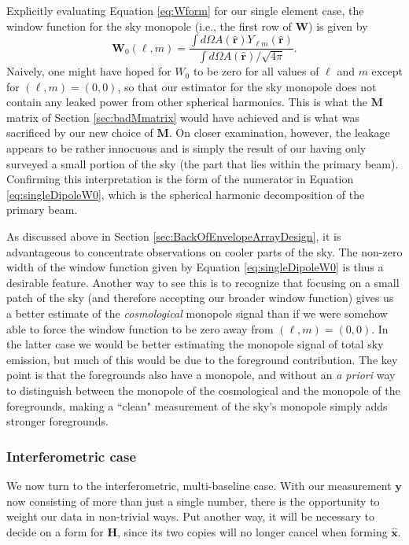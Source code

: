 \documentclass[twocolumn,apj,numberedappendix]{emulateapj}
\newcommand{\xhat}{\hat{\mathbf{x}}}
\newcommand{\Hmat}{\mathbf{H}}
\newcommand{\M}{\mathbf{M}}
\newcommand{\W}{\mathbf{W}}
\begin{document}
Explicitly evaluating Equation \eqref{eq:Wform} for our single element case, the window function for the sky monopole (i.e., the first row of $\W$) is given by
\begin{equation}
\W_{0}(\ell,m) = \frac{\int d\Omega A(\mathbf{\hat{r}}) Y_{\ell m} (\mathbf{\hat{r}})}{\int d\Omega A(\mathbf{\hat{r}}) / \sqrt{4 \pi}}.
\label{eq:singleDipoleW0}
\end{equation}
Naively, one might have hoped for $W_0$ to be zero for all values of $\ell$ and $m$ except for $(\ell, m) = (0,0)$, so that our estimator for the sky monopole does not contain any leaked power from other spherical harmonics. This is what the $\M$ matrix of Section \ref{sec:badMmatrix} would have achieved and is what was sacrificed by our new choice of $\M$. On closer examination, however, the leakage appears to be rather innocuous and is simply the result of our having only surveyed a small portion of the sky (the part that lies within the primary beam). Confirming this interpretation is the form of the numerator in Equation \eqref{eq:singleDipoleW0}, which is the spherical harmonic decomposition of the primary beam.

As discussed above in Section \ref{sec:BackOfEnvelopeArrayDesign}, it is advantageous to concentrate observations on cooler parts of the sky. The non-zero width of the window function given by Equation \eqref{eq:singleDipoleW0} is thus a desirable feature. Another way to see this is to recognize that focusing on a small patch of the sky (and therefore accepting our broader window function) gives us a better estimate of the \emph{cosmological} monopole signal than if we were somehow able to force the window function to be zero away from $(\ell,m) = (0,0)$. In the latter case we would be better estimating the monopole signal of total sky emission, but much of this would be due to the foreground contribution. The key point is that the foregrounds also have a monopole, and without an \emph{a priori} way to distinguish between the monopole of the cosmological and the monopole of the foregrounds, making a ``clean" measurement of the sky's monopole simply adds stronger foregrounds.

\subsubsection{Interferometric case}
\label{sec:MultiBaselineWorkedExample}
We now turn to the interferometric, multi-baseline case. With our measurement $\mathbf{y}$ now consisting of more than just a single number, there is the opportunity to weight our data in non-trivial ways. Put another way, it will be necessary to decide on a form for $\Hmat$, since its two copies will no longer cancel when forming $\xhat$.
\end{document}
